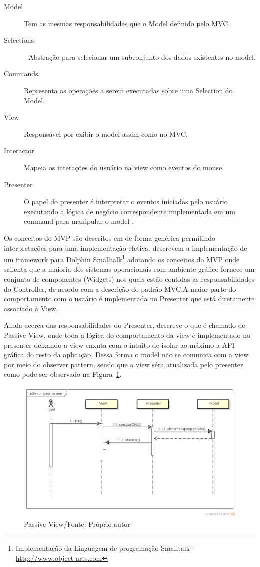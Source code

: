 \begin{description}
  \item[Model] Tem as mesmas responsabilidades que o Model definido pelo MVC.
  \item[Selections] - Abstração para selecionar um subconjunto dos dados
  existentes no model.
  \item [Commands] Representa as operações a serem executadas sobre uma
  Selection do Model.
  \item [View] Responsável por exibir o model assim como no MVC.
  \item [Interactor] Mapeia os interações do usuário na view como eventos do
  mouse.
  \item [Presenter] O papel do presenter é interpretar o eventos iniciados pelo
  usuário executando a lógica de negócio correspondente implementada em um
  command para manipular o model \cite{Potel96mvp}.
\end{description}


Os conceitos do MVP são descritos em  de forma genérica
permitindo interpretações para uma implementação efetiva.
 descrevem a implementação de um framework para
Dolphin Smalltalk\footnote{Implementação da Linguagem de programação Smalltalk - 
\url{http://www.object-arts.com}} adotando os conceitos do MVP onde salienta que
a maioria dos sistemas operacionais com ambiente gráfico fornece um conjunto de
componentes (Widgets) nos quais estão contidas as responsabilidades do
Controller, de acordo com a descrição do padrão MVC.A maior parte do
comportamento com o usuário é implementada no Presenter que está
diretamente associado à View.

Ainda acerca das responsabilidades do Presenter,  descreve
o que é chamado de Passive View, onde toda a lógica do comportamento da view é
implementado no presenter deixando a view enxuta com o intuito de isolar ao
máximo a API gráfica do resto da aplicação. Dessa forma o model não se comunica
com a view por meio do observer pattern, sendo que a view séra atualizada pelo
presenter como pode ser observado na Figura~\ref{fig:mvp_passive_view}.

\begin{figure}[h]
	\centering
	\includegraphics[scale=0.5]{img/mvp_passive_view.png}
	\caption{Passive View/Fonte: Próprio autor}
	\label{fig:mvp_passive_view}
\end{figure}

